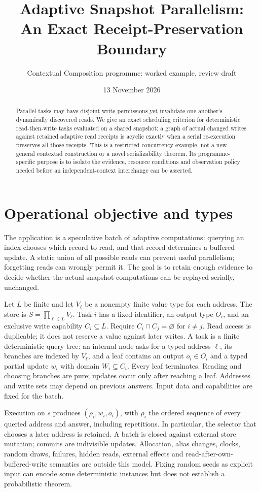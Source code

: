\documentclass[11pt]{article}
\title{Adaptive Snapshot Parallelism:\\An Exact Receipt-Preservation Boundary}
\author{Contextual Composition programme: worked example, review draft}
\date{13 November 2026}
\begin{document}
\maketitle
\begin{abstract}
Parallel tasks may have disjoint write permissions yet invalidate one another's dynamically discovered reads. We give an exact scheduling criterion for deterministic read-then-write tasks evaluated on a shared snapshot: a graph of actual changed writes against retained adaptive read receipts is acyclic exactly when a serial re-execution preserves all those receipts. This is a restricted concurrency example, not a new general contextad construction or a novel serializability theorem. Its programme-specific purpose is to isolate the evidence, resource conditions and observation policy needed before an independent-context interchange can be asserted.
\end{abstract}
\section{Operational objective and types}
The application is a speculative batch of adaptive computations: querying an index chooses which record to read, and that record determines a buffered update. A static union of all possible reads can prevent useful parallelism; forgetting reads can wrongly permit it. The goal is to retain enough evidence to decide whether the actual snapshot computations can be replayed serially, unchanged.

Let $L$ be finite and let $V_\ell$ be a nonempty finite value type for each address. The store is $S=\prod_{\ell\in L}V_\ell$. Task $i$ has a fixed identifier, an output type $O_i$, and an exclusive write capability $C_i\subseteq L$. Require $C_i\cap C_j=\varnothing$ for $i\ne j$. Read access is duplicable; it does not reserve a value against later writes. A task is a finite deterministic query tree: an internal node asks for a typed address $\ell$, its branches are indexed by $V_\ell$, and a leaf contains an output $o_i\in O_i$ and a typed partial update $w_i$ with domain $W_i\subseteq C_i$. Every leaf terminates. Reading and choosing branches are pure; updates occur only after reaching a leaf. Addresses and write sets may depend on previous answers. Input data and capabilities are fixed for the batch.

Execution on $s$ produces $(\rho_i,w_i,o_i)$, with $\rho_i$ the ordered sequence of every queried address and answer, including repetitions. In particular, the selector that chooses a later address is retained. A batch is closed against external store mutation; commits are indivisible updates. Allocation, alias changes, clocks, random draws, failures, hidden reads, external effects and read-after-own-buffered-write semantics are outside this model. Fixing random seeds as explicit input can encode some deterministic instances but does not establish a probabilistic theorem.
\end{document}
